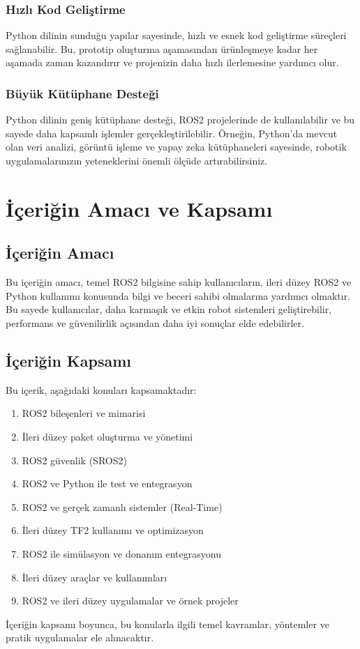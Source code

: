 \subsubsection{Hızlı Kod Geliştirme}
Python dilinin sunduğu yapılar sayesinde, hızlı ve esnek kod geliştirme süreçleri sağlanabilir. Bu, prototip oluşturma aşamasından ürünleşmeye kadar her aşamada zaman kazandırır ve projenizin daha hızlı ilerlemesine yardımcı olur.

\subsubsection{Büyük Kütüphane Desteği}
Python dilinin geniş kütüphane desteği, ROS2 projelerinde de kullanılabilir ve bu sayede daha kapsamlı işlemler gerçekleştirilebilir. Örneğin, Python'da mevcut olan veri analizi, görüntü işleme ve yapay zeka kütüphaneleri sayesinde, robotik uygulamalarınızın yeteneklerini önemli ölçüde artırabilirsiniz.
\section{İçeriğin Amacı ve Kapsamı}
\subsection{İçeriğin Amacı}
Bu içeriğin amacı, temel ROS2 bilgisine sahip kullanıcıların, ileri düzey ROS2 ve Python kullanımı konusunda bilgi ve beceri sahibi olmalarına yardımcı olmaktır. Bu sayede kullanıcılar, daha karmaşık ve etkin robot sistemleri geliştirebilir, performans ve güvenilirlik açısından daha iyi sonuçlar elde edebilirler.

\subsection{İçeriğin Kapsamı}
Bu içerik, aşağıdaki konuları kapsamaktadır:

\begin{enumerate}
\item ROS2 bileşenleri ve mimarisi
\item İleri düzey paket oluşturma ve yönetimi
\item ROS2 güvenlik (SROS2)
\item ROS2 ve Python ile test ve entegrasyon
\item ROS2 ve gerçek zamanlı sistemler (Real-Time)
\item İleri düzey TF2 kullanımı ve optimizasyon
\item ROS2 ile simülasyon ve donanım entegrasyonu
\item İleri düzey araçlar ve kullanımları
\item ROS2 ve ileri düzey uygulamalar ve örnek projeler
\end{enumerate}

İçeriğin kapsamı boyunca, bu konularla ilgili temel kavramlar, yöntemler ve pratik uygulamalar ele alınacaktır.